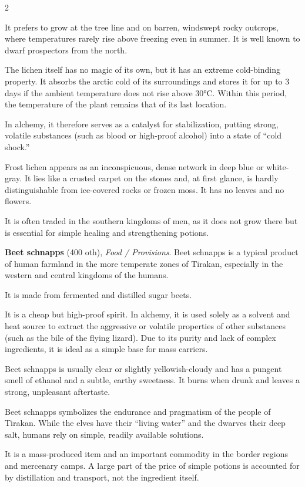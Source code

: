 \begin{multicols}{2}
\begin{denseitemize}
It prefers to grow at the tree line and on barren, windswept rocky outcrops, where temperatures rarely rise above freezing even in summer. It is well known to dwarf prospectors from the north.

The lichen itself has no magic of its own, but it has an extreme cold-binding property. It absorbs the arctic cold of its surroundings and stores it for up to 3 days if the ambient temperature does not rise above 30°C. Within this period, the temperature of the plant remains that of its last location.

In alchemy, it therefore serves as a catalyst for stabilization, putting strong, volatile substances (such as blood or high-proof alcohol) into a state of “cold shock.”

Frost lichen appears as an inconspicuous, dense network in deep blue or white-gray. It lies like a crusted carpet on the stones and, at first glance, is hardly distinguishable from ice-covered rocks or frozen moss. It has no leaves and no flowers. 

It is often traded in the southern kingdoms of men, as it does not grow there but is essential for simple healing and strengthening potions.
        \item \textbf{Beet schnapps} (400 oth), \textit{Food / Provisions}.
        Beet schnapps is a typical product of human farmland in the more temperate zones of Tirakan, especially in the western and central kingdoms of the humans.

It is made from fermented and distilled sugar beets.

It is a cheap but high-proof spirit. In alchemy, it is used solely as a solvent and heat source to extract the aggressive or volatile properties of other substances (such as the bile of the flying lizard). Due to its purity and lack of complex ingredients, it is ideal as a simple base for mass carriers.

Beet schnapps is usually clear or slightly yellowish-cloudy and has a pungent smell of ethanol and a subtle, earthy sweetness. It burns when drunk and leaves a strong, unpleasant aftertaste.

Beet schnapps symbolizes the endurance and pragmatism of the people of Tirakan. While the elves have their “living water” and the dwarves their deep salt, humans rely on simple, readily available solutions.

It is a mass-produced item and an important commodity in the border regions and mercenary camps. A large part of the price of simple potions is accounted for by distillation and transport, not the ingredient itself.


\end{denseitemize}
\end{multicols}
